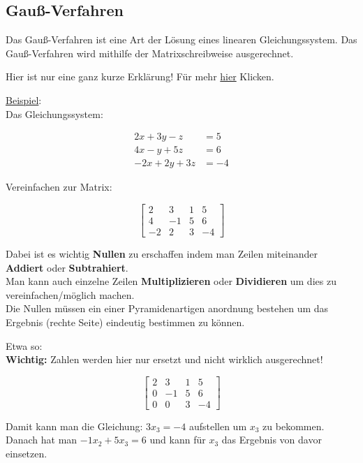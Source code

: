 \subsection{Gauß-Verfahren}
Das Gauß-Verfahren ist eine Art der Lösung eines linearen Gleichungssystem. 
Das Gauß-Verfahren wird mithilfe der Matrixschreibweise ausgerechnet.

Hier ist nur eine ganz kurze Erklärung! 
Für mehr \href{https://simpleclub.com/lessons/mathematik-gaussalgorithmus}{hier} Klicken.

\underline{Beispiel}: \\
Das Gleichungssystem: 

\begin{align*}
    2x + 3y - z &= 5 \\
    4x - y + 5z &= 6 \\
    -2x + 2y + 3z &= -4
\end{align*}

Vereinfachen zur Matrix: 

$$
\left[
\begin{array}{ccc|c}
    2 & 3 & 1 & 5 \\
    4 & -1 & 5 & 6 \\
    -2 & 2 & 3 & -4
\end{array}
\right]
$$

Dabei ist es wichtig \textbf{Nullen} zu erschaffen indem man Zeilen miteinander \textbf{Addiert} oder \textbf{Subtrahiert}. \\
Man kann auch einzelne Zeilen \textbf{Multiplizieren} oder \textbf{Dividieren} um dies zu vereinfachen/möglich machen. \\
Die Nullen müssen ein einer Pyramidenartigen anordnung bestehen um das Ergebnis (rechte Seite) eindeutig bestimmen zu können. 

Etwa so: \\
\textbf{Wichtig:} Zahlen werden hier nur ersetzt und nicht wirklich ausgerechnet!

$$
\left[
\begin{array}{ccc|c}
    2 & 3 & 1 & 5 \\
    0 & -1 & 5 & 6 \\
    0 & 0 & 3 & -4
\end{array}
\right]
$$

Damit kann man die Gleichung: $3x_3 = -4$ aufstellen um $x_3$ zu bekommen. \\
Danach hat man $-1x_2 + 5x_3 = 6$ und kann für $x_3$ das Ergebnis von davor einsetzen. 
